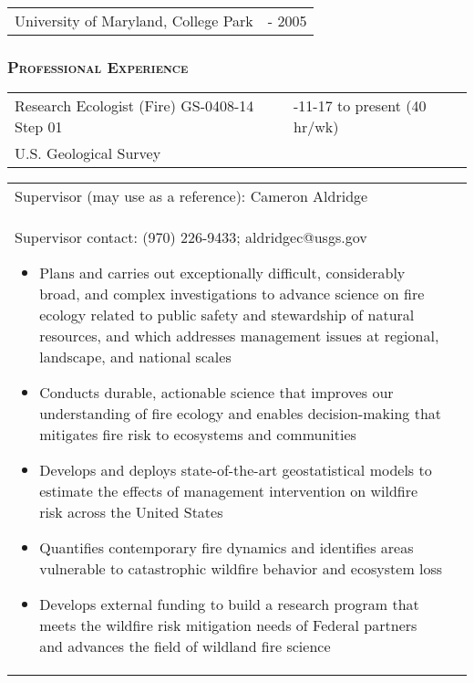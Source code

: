 \documentclass[10pt,english]{article}
\providecommand{\tabularnewline}{\\}
\begin{document}
\begin{tabularx}{\textwidth}{@{}>{\raggedright}p{5.25in} >{\raggedleft}X@{}}
University of Maryland, College Park & 2003 - 2005 \tabularnewline
\end{tabularx}


\subsubsection*{\textsc{Professional Experience}}
\vspace{-0.5ex}

\linespread{1.1}

\renewcommand{\arraystretch}{1.2}
\begin{tabularx}{\textwidth}{@{}>{\raggedright}p{3.75in} >{\raggedleft}X@{}}
Research Ecologist (Fire) GS-0408-14 Step 01 & 2024-11-17 to present (40 hr/wk) \tabularnewline
U.S. Geological Survey & \tabularnewline
\end{tabularx}

\renewcommand{\arraystretch}{1.2}
\begin{tabularx}{\textwidth}{@{}>{\raggedright}p{6.25in} >{\raggedleft}X@{}}
\addtolength{\leftskip}{5ex}Supervisor (may use as a reference): Cameron Aldridge \tabularnewline
\addtolength{\leftskip}{5ex}Supervisor contact: (970) 226-9433; aldridgec@usgs.gov
\begin{itemize}
\itemsep0em
\item{Plans and carries out exceptionally difficult, considerably broad, and complex investigations to advance science on fire ecology related to public safety and stewardship of natural resources, and which addresses management issues at regional, landscape, and national scales}
\item{Conducts durable, actionable science that improves our understanding of fire ecology and enables decision-making that mitigates fire risk to ecosystems and communities}
\item{Develops and deploys state-of-the-art geostatistical models to estimate the effects of management intervention on wildfire risk across the United States}
\item{Quantifies contemporary fire dynamics and identifies areas vulnerable to catastrophic wildfire behavior and ecosystem loss}
\item{Develops external funding to build a research program that meets the wildfire risk mitigation needs of Federal partners and advances the field of wildland fire science}
\end{itemize}
\end{tabularx}
\end{document}
